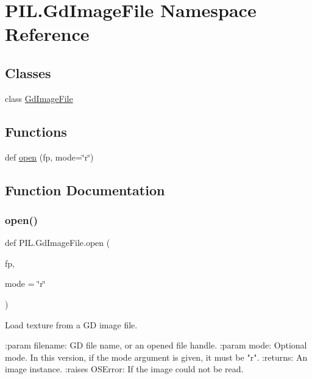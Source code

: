 \hypertarget{namespacePIL_1_1GdImageFile}{}\section{P\+I\+L.\+Gd\+Image\+File Namespace Reference}
\label{namespacePIL_1_1GdImageFile}
\subsection*{Classes}
\begin{DoxyCompactItemize}
\item 
class \hyperlink{classPIL_1_1GdImageFile_1_1GdImageFile}{Gd\+Image\+File}
\end{DoxyCompactItemize}
\subsection*{Functions}
\begin{DoxyCompactItemize}
\item 
def \hyperlink{namespacePIL_1_1GdImageFile_a591a1a2332e1a3dd15e6eb749204954a}{open} (fp, mode=\char`\"{}r\char`\"{})
\end{DoxyCompactItemize}


\subsection{Function Documentation}
\mbox{\label{namespacePIL_1_1GdImageFile_a591a1a2332e1a3dd15e6eb749204954a}} 
\subsubsection{\texorpdfstring{open()}{open()}}
{\footnotesize\ttfamily def P\+I\+L.\+Gd\+Image\+File.\+open (\begin{DoxyParamCaption}\item[{}]{fp,  }\item[{}]{mode = {\ttfamily \char`\"{}r\char`\"{}} }\end{DoxyParamCaption})}

\begin{DoxyVerb}Load texture from a GD image file.

:param filename: GD file name, or an opened file handle.
:param mode: Optional mode.  In this version, if the mode argument
    is given, it must be "r".
:returns: An image instance.
:raises OSError: If the image could not be read.
\end{DoxyVerb}
 